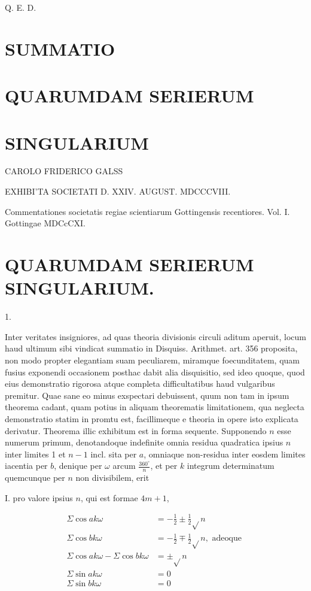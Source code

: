 \documentclass[10pt]{article}
\begin{document}
Q. E. D.

\section*{SUMMATIO }
\section*{QUARUMDAM SERIERUM}
\section*{SINGULARIUM}
CAROLO FRIDERICO GALSS

EXHIBI'TA SOCIETATI D. XXIV. AUGUST. MDCCCVIII.

Commentationes societatis regiae scientiarum Gottingensis recentiores. Vol. I. Gottingae MDCcCXI.

\section*{QUARUMDAM SERIERUM SINGULARIUM.}
1.

Inter veritates insigniores, ad quas theoria divisionis circuli aditum aperuit, locum haud ultimum sibi vindicat summatio in Disquiss. Arithmet. art. 356 proposita, non modo propter elegantiam suam peculiarem, miramque foecunditatem, quam fusius exponendi occasionem posthac dabit alia disquisitio, sed ideo quoque, quod eius demonstratio rigorosa atque completa difficultatibus haud vulgaribus premitur. Quae sane eo minus exspectari debuissent, quum non tam in ipsum theorema cadant, quam potius in aliquam theorematis limitationem, qua neglecta demonstratio statim in promtu est, facillimeque e theoria in opere isto explicata derivatur. Theorema illic exhibitum est in forma sequente. Supponendo \(n\) esse numerum primum, denotandoque indefinite omnia residua quadratica ipsius \(n\) inter limites 1 et \(n-1\) incl. sita per \(a\), omniaque non-residua inter eosdem limites iacentia per \(b\), denique per \(\omega\) arcum \(\frac{360^{\circ}}{n}\), et per \(k\) integrum determinatum quemcunque per \(n\) non divisibilem, erit

I. pro valore ipsius \(n\), qui est formae \(4 m+1\),

\[
\begin{aligned}
\Sigma \cos a k \omega & =-\frac{1}{2} \pm \frac{1}{2} \sqrt{ } n \\
\Sigma \cos b k \omega & =-\frac{1}{2} \mp \frac{1}{2} \sqrt{ } n, \text { adeoque } \\
\Sigma \cos a k \omega-\Sigma \cos b k \omega & = \pm \sqrt{ } n \\
\Sigma \sin a k \omega & =0 \\
\Sigma \sin b k \omega & =0
\end{aligned}
\]
\end{document}
